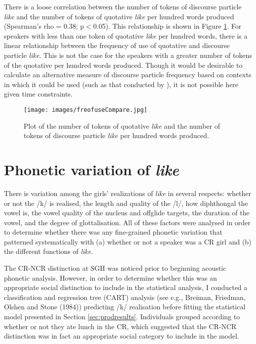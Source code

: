 There is a loose correlation between the number of tokens of discourse particle \textit{like} and the number of tokens of quotative \textit{like} per hundred words produced (Spearman's rho = 0.38; p$<$0.05).  This relationship is shown in Figure \ref{fig:ComparingQDP}.  For speakers with less than one token of quotative \textit{like} per hundred words, there is a linear relationship between the frequency of use of quotative and discourse particle \textit{like}.  This is not the case for the speakers with a greater number of tokens of the quotative per hundred words produced.  Though it would be desirable to calculate an alternative measure of discourse particle frequency based on contexts in which it could be used (such as that conducted by ), it is not possible here given time constraints. 

\begin{figure}
	\centering
		\texttt{[image: images/freofuseCompare.jpg]}
	\caption{Plot of the number of tokens of quotative \textit{like} and the number of tokens of discourse particle \textit{like} per hundred words produced.}
	\label{fig:ComparingQDP}
\end{figure}



\section{Phonetic variation of \textit{like}}\label{sec:phoneticlike}

There is variation among the girls' realizations of \textit{like} in several respects: whether or not the /k/ is realised, the length and quality of the /l/, how diphthongal the vowel is, the vowel quality of the nucleus and offglide targets, the duration of the vowel, and the degree of glottalisation.  All of these factors were analysed in order to determine whether there was any fine-grained phonetic variation that patterned systematically with (a) whether or not a speaker was a CR girl and (b) the different functions of \textit{like}.  


The CR-NCR distinction at SGH was noticed prior to beginning acoustic phonetic analysis.  However, in order to determine whether this was an appropriate social distinction to include in the statistical analysis, I conducted a classification and regression tree (CART) analysis (see e.g., Breiman, Friedman, Olshen and Stone (1984)) predicting /k/ realisation before fitting the statistical model presented in Section \ref{sec:prodresults}.  Individuals grouped according to whether or not they ate lunch in the CR, which suggested that the CR-NCR distinction was in fact an appropriate social category to include in the model. \nocite{breimanetal1984}



